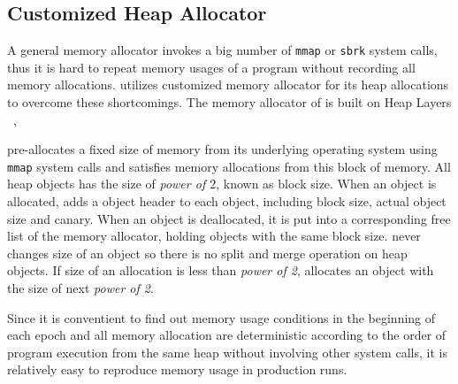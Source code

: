 
\subsection{Customized Heap Allocator}
\label{sec:allocator}
A general memory allocator invokes a big number of \texttt{mmap} or \texttt{sbrk} system calls,
thus it is hard to repeat memory usages of a program without recording all memory allocations. 
\DoubleTake{} utilizes customized memory allocator for its heap allocations to overcome these shortcomings. The memory allocator of \DoubleTake{} is built on Heap Layers ~\cite{heaplayers}, 

\DoubleTake{} pre-allocates a fixed size of memory 
from its underlying operating system using \texttt{mmap} system calls and 
satisfies memory allocations from this block of memory.
All heap objects has the size of {\it power of $2$}, known as block size. 
When an object is allocated, \doubletake{} adds a object header to each object, including block size,
actual object size and canary.
When an object is deallocated, it is put into a corresponding free list of the memory allocator, 
holding objects with the same block size. 
\DoubleTake{} never changes size of an object so there is no split and merge operation on heap objects.
If size of an allocation is less than {\it power of 2}, 
\DoubleTake{} allocates an object with the size of next {\it power of 2}.

Since it is conventient to find out memory usage conditions in the beginning of each epoch 
and all memory allocation are deterministic according to the order of program execution from the same heap without involving other system calls,  
it is relatively easy to reproduce memory usage in production runs.

